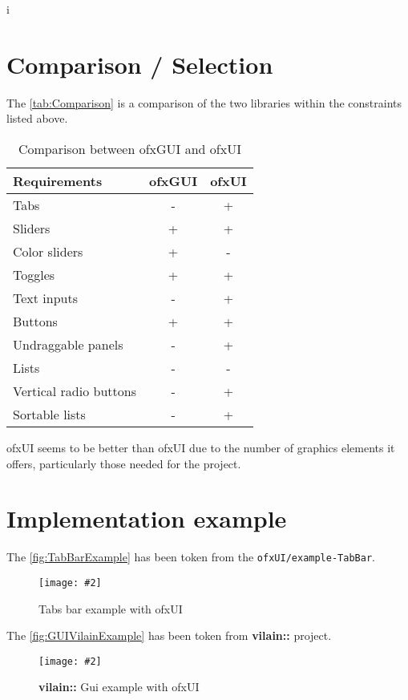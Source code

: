 i\documentclass[a4paper,titlepage,oneside]{article}
\newcommand{\image}[5][\textwidth]{%
    \begin{figure}[h]
        \centering
            \begin{minipage}[c]{#1}
                \centering
                \texttt{[image: \#2]}
                \caption{#4}
                \label{#5}
            \end{minipage}
    \end{figure}
}
\newcommand{\tableau}[4]{
    \begin{table}[h]
        \centering
        \begin{tabular}{#1}
            #4
        \end{tabular}
        \caption{#2}
        \label{#3}
    \end{table}
}
\newcommand{\vilain}{\textbf{vilain::}}
\begin{document}
\section{Comparison / Selection}
The \tablename \vref{tab:Comparison} is a comparison of the two libraries within the constraints listed above.\\
\tableau{|p{4cm}|c|c|}{Comparison between ofxGUI and ofxUI}{tab:Comparison}{
  \hline
  Requirements & ofxGUI & ofxUI\\
  \hline
  Tabs & - & + \\
  Sliders & + & + \\
  Color sliders & + & - \\
  Toggles & + & + \\
  Text inputs & - & + \\
  Buttons & + & + \\
  Undraggable panels & - & + \\
  Lists & - & - \\
  Vertical radio buttons & - & + \\
  Sortable lists & - & + \\
  \hline
}

ofxUI seems to be better than ofxUI due to the number of graphics
elements it offers, particularly those needed for the project.

\section{Implementation example}
The \figurename \vref{fig:TabBarExample} has been token from the
\texttt{ofxUI/example-TabBar}.
\image{data/TabBar.jpg}{width=5cm}{Tabs bar example with
  ofxUI}{fig:TabBarExample}
The \figurename \vref{fig:GUIVilainExample} has been token from \vilain{} project.
\image{data/GUIVilain.jpg}{width=13cm}{\vilain{} Gui example with
  ofxUI}{fig:GUIVilainExample}
\end{document}
